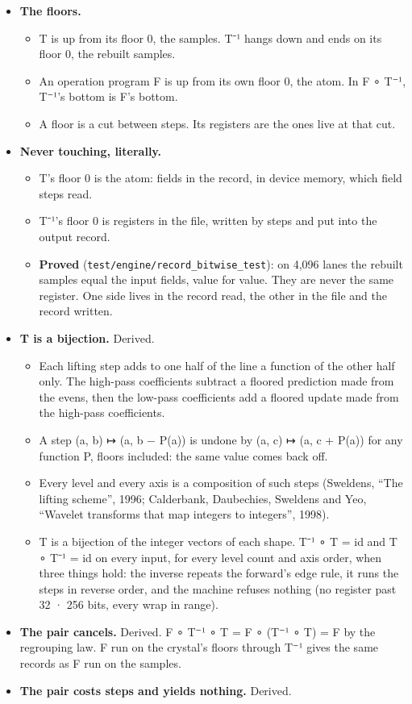 \begin{itemize}
\item \textbf{The floors.}

\begin{itemize}
\item T is up from its floor 0, the samples. T⁻¹ hangs down and ends on its floor 0, the rebuilt samples.
\item An operation program F is up from its own floor 0, the atom. In F ∘ T⁻¹, T⁻¹'s bottom is F's bottom.
\item A floor is a cut between steps. Its registers are the ones live at that cut.
\end{itemize}
\item \textbf{Never touching, literally.}

\begin{itemize}
\item T's floor 0 is the atom: fields in the record, in device memory, which field steps read.
\item T⁻¹'s floor 0 is registers in the file, written by steps and put into the output record.
\item \textbf{Proved} (\texttt{test/\allowbreak{}engine/\allowbreak{}record\_\allowbreak{}bitwise\_\allowbreak{}test}): on 4,096 lanes the rebuilt samples equal the input fields, value for value. They are never the same register. One side lives in the record read, the other in the file and the record written.
\end{itemize}
\item \textbf{T is a bijection.} Derived.

\begin{itemize}
\item Each lifting step adds to one half of the line a function of the other half only. The high-pass coefficients subtract a floored prediction made from the evens, then the low-pass coefficients add a floored update made from the high-pass coefficients.
\item A step (a, b) ↦ (a, b − P(a)) is undone by (a, c) ↦ (a, c + P(a)) for any function P, floors included: the same value comes back off.
\item Every level and every axis is a composition of such steps (Sweldens, “The lifting scheme”, 1996; Calderbank, Daubechies, Sweldens and Yeo, “Wavelet transforms that map integers to integers”, 1998).
\item T is a bijection of the integer vectors of each shape. T⁻¹ ∘ T = id and T ∘ T⁻¹ = id on every input, for every level count and axis order, when three things hold: the inverse repeats the forward's edge rule, it runs the steps in reverse order, and the machine refuses nothing (no register past 32 · 256 bits, every wrap in range).
\end{itemize}
\item \textbf{The pair cancels.} Derived. F ∘ T⁻¹ ∘ T = F ∘ (T⁻¹ ∘ T) = F by the regrouping law. F run on the crystal's floors through T⁻¹ gives the same records as F run on the samples.
\item \textbf{The pair costs steps and yields nothing.} Derived.


\end{itemize}
